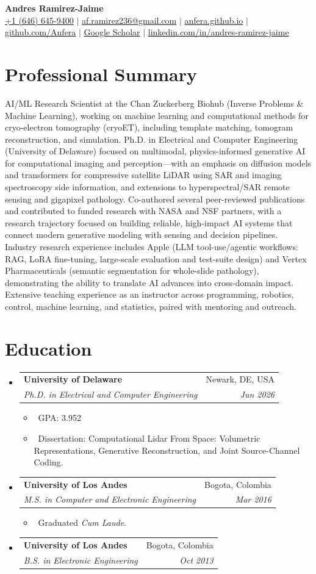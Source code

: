 \documentclass[letterpaper,10pt]{article}
\makeatletter
\newcommand{\resumeItem}[1]{\item\small{#1}}
\newcommand{\resumeSubheading}[4]{
\vspace{-1pt}\item
  \begin{tabular*}{0.97\textwidth}[t]{l@{\extracolsep{\fill}}r}
    \textbf{#1} & #2 \\
    \textit{#3} & \textit{#4} \\
  \end{tabular*}\vspace{-7pt}
}
\newcommand{\resumeSubHeadingList}{\begin{itemize}[leftmargin=0.15in, label={}]}
\newcommand{\resumeSubHeadingListEnd}{\end{itemize}}
\makeatother
\begin{document}
\begin{center}
  \textbf{\Huge Andres Ramirez-Jaime} \\
  \small
  \href{tel:+16466459400}{+1 (646) 645-9400} $|$
  \href{mailto:af.ramirez236@gmail.com}{af.ramirez236@gmail.com} $|$
  \href{https://anfera.github.io/}{anfera.github.io} $|$
  \href{https://github.com/Anfera}{github.com/Anfera} $|$
  \href{https://scholar.google.com/citations?user=ZCrWcHEAAAAJ&hl=en}{Google Scholar} $|$
  \href{https://www.linkedin.com/in/andres-ramirez-jaime}{linkedin.com/in/andres-ramirez-jaime}
\end{center}

\section{Professional Summary}
AI/ML Research Scientist at the Chan Zuckerberg Biohub (Inverse Problems \& Machine Learning), working on machine learning and computational methods for cryo-electron tomography (cryoET), including template matching, tomogram reconstruction, and simulation. Ph.D. in Electrical and Computer Engineering (University of Delaware) focused on multimodal, physics-informed generative AI for computational imaging and perception---with an emphasis on diffusion models and transformers for compressive satellite LiDAR using SAR and imaging spectroscopy side information, and extensions to hyperspectral/SAR remote sensing and gigapixel pathology. Co-authored several peer-reviewed publications and contributed to funded research with NASA and NSF partners, with a research trajectory focused on building reliable, high-impact AI systems that connect modern generative modeling with sensing and decision pipelines. Industry research experience includes Apple (LLM tool-use/agentic workflows: RAG, LoRA fine-tuning, large-scale evaluation and test-suite design) and Vertex Pharmaceuticals (semantic segmentation for whole-slide pathology), demonstrating the ability to translate AI advances into cross-domain impact. Extensive teaching experience as an instructor across programming, robotics, control, machine learning, and statistics, paired with mentoring and outreach.

\section{Education}
\resumeSubHeadingList
  \resumeSubheading
      {University of Delaware}{Newark, DE, USA}
      {Ph.D. in Electrical and Computer Engineering}{Jun 2026}
      \resumeSubHeadingList
          \resumeItem{\textbullet\ GPA: 3.952}
          \resumeItem{\textbullet\ Dissertation: Computational Lidar From Space: Volumetric Representations, Generative Reconstruction, and Joint Source-Channel Coding.}
      \resumeSubHeadingListEnd
  \resumeSubheading
      {University of Los Andes}{Bogota, Colombia}
      {M.S. in Computer and Electronic Engineering}{Mar 2016}
      \resumeSubHeadingList
          \resumeItem{\textbullet\ Graduated \textit{Cum Laude}.}
      \resumeSubHeadingListEnd
  \resumeSubheading
      {University of Los Andes}{Bogota, Colombia}
      {B.S. in Electronic Engineering}{Oct 2013}
\resumeSubHeadingListEnd
\end{document}
